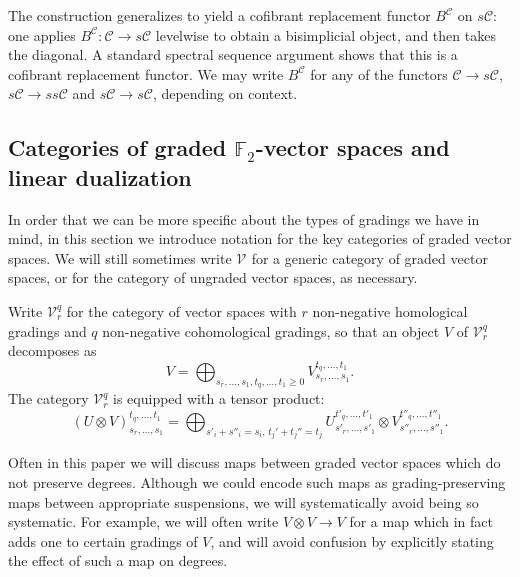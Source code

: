 \documentclass[11pt]{amsart} \renewcommand{\baselinestretch}{1.4}
\theoremstyle{plain}
\theoremstyle{definition}
\renewcommand{\to}{\longrightarrow}
\newcommand{\calV}{\mathcal{V}}
\newcommand{\calc}{\mathcal{C}}
\newcommand{\vect}[2]{\calV^{#1}_{#2}}
\newcommand{\F}{\mathbb{F}}
\newcommand{\Ftwo}{\F_2}
\begin{document}
\begin{Conventions and notation}
The construction generalizes to yield a cofibrant replacement functor $B^{\calc}$ on $s\calc$: one applies  $B^{\calc}:\calc\to s\calc$ levelwise to obtain a bisimplicial object, and then takes the diagonal. A standard spectral sequence argument shows that this is a cofibrant replacement functor. We may write $B^{\calc}$ for any of the functors $\calc\to s\calc$, $s\calc\to ss\calc$ and $s\calc\to s\calc$, depending on context.




\subsection{Categories of graded $\Ftwo $-vector spaces and linear dualization}
In order that we can be more specific about the types of gradings we have in mind, in this section we introduce  notation for the key categories of graded vector spaces. We will still sometimes write $\vect{}{}$ for a generic category of graded vector spaces, or for the category of ungraded vector spaces, as necessary.

Write $\vect{q}{r}$ for the category of vector spaces with $r$ non-negative homological gradings and $q$ non-negative cohomological gradings, so that an object $V$ of $\vect{q}{r}$ decomposes as
\[V=\bigoplus_{s_r,\ldots,s_1,t_q,\ldots,t_1\geq0}V^{t_q,\ldots,t_1}_{s_r,\ldots,s_1}.\]
The category $\vect{q}{r}$ is equipped with a tensor product:
\[(U\otimes V)^{t_q,\ldots,t_1}_{s_r,\ldots,s_1}=\bigoplus_{s'_i+s''_i=s_i,\,t_j'+t_j''=t_j}U^{t'_q,\ldots,t'_1}_{s'_r,\ldots,s'_1}\otimes V^{t''_q,\ldots,t''_1}_{s''_r,\ldots,s''_1}.\]

Often in this paper we will discuss maps between graded vector spaces which do not preserve degrees. %
Although we could encode such maps as grading-preserving maps between appropriate suspensions, we will systematically avoid being so systematic. For example, we will often write $V\otimes V\to V$ for a map which in fact adds one to certain gradings of $V$, and will avoid confusion by explicitly stating the effect of such a map on degrees.


\end{Conventions and notation}
\end{document}
